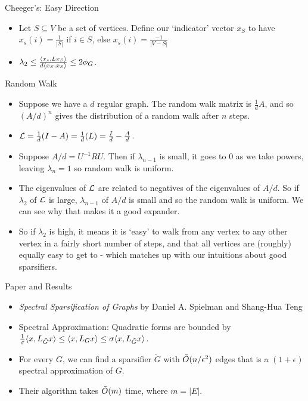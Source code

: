\documentclass[presentation]{beamer}
\begin{document}
\begin{frame}[label={sec:org549a654}]{Cheeger's: Easy Direction}
\begin{itemize}
\item Let \(S \subseteq V\) be a set of vertices. Define our `indicator' vector \(x_S\) to have \(x_s(i)=\frac{1}{|S|}\) if \(i \in S\), else \(x_s(i)=\frac{-1}{|V-S|}\)
\item \(\lambda_2 \le \frac{\langle x_s , Lx_S \rangle}{d\langle x_S , x_S \rangle} \le 2\phi_G\).
\end{itemize}
\end{frame}
\begin{frame}[label={sec:org6d68fff}]{Random Walk}
\begin{itemize}
\item Suppose we have a \(d\) regular graph. The random walk matrix is \(\frac{1}{d}A\), and so \((A/d)^n\) gives the distribution of a random walk after \(n\) steps.
\item \(\mathcal{L}=\frac{1}{d}(I-A)=\frac{1}{d}(L)=\frac{I}{d}-\frac{A}{d}\).
\item Suppose \(A/d=U^{-1}RU\). Then if \(\lambda_{n-1}\) is small, it goes to \(0\) as we take powers, leaving \(\lambda_n=1\) so random walk is uniform.
\item The eigenvalues of \(\mathcal{L}\) are related to negatives of the eigenvalues of \(A/d\). So if \(\lambda_2\) of \(\mathcal{L}\) is large, \(\lambda_{n-1}\) of \(A/d\) is small and so the random walk is uniform. We can see why that makes it a good expander.
\item So if \(\lambda_2\) is high, it means it is `easy' to walk from any vertex to any other vertex in a fairly short number of steps, and that all vertices are (roughly) equally easy to get to - which matches up with our intuitions about good sparsifiers.
\end{itemize}
\end{frame}
\begin{frame}[label={sec:org5bac27d}]{Paper and Results}
\begin{itemize}
\item \emph{Spectral Sparsification of Graphs} by Daniel A. Spielman and Shang-Hua Teng
\item Spectral Approximation: Quadratic forms are bounded by \(\frac{1}{\sigma}\langle x , L_{\tilde{G}}x \rangle \le \langle x , L_Gx \rangle \le \sigma\langle x , L_{\tilde{G}}x \rangle\).
\item For every \(G\), we can find a sparsifier \(\tilde{G}\) with \(\tilde{O}(n/\epsilon^2)\) edges that is a \((1+\epsilon)\) spectral approximation of \(G\).
\item Their algorithm takes \(\tilde{O}(m)\) time, where \(m=|E|\).
\end{itemize}
\end{frame}
\end{document}
